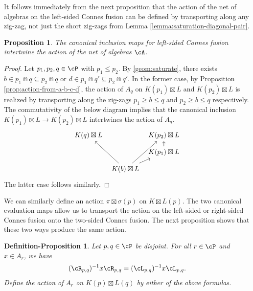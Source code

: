 \documentclass[11pt,reqno]{amsart}
\numberwithin{equation}{section}
\theoremstyle{plain}
\newtheorem{proposition}[equation]{Proposition}
\newtheorem{definitionproposition}[equation]{Definition-Proposition}
\theoremstyle{definition}
\begin{document}
It follows immediately from the next proposition that the action of the net of algebras on the left-sided Connes fusion can be defined by transporting along any zig-zag, not just the short zig-zags from Lemma \ref{lemma:saturation-diagonal-pair}.

\begin{proposition}\label{prop:one-sided-inclusions-intertwine}
    The canonical inclusion maps for left-sided Connes fusion intertwine the action of the net of algebras $\cA$.
\end{proposition}

\begin{proof}
    Let $p_1,p_2,q\in{\cP}$ with $p_1\leq p_2$. By \ref{geom:saturate}, there exists $b\in p_1\Cap q\subseteq p_2\Cap q$ or $d\in p_1\Cap q'\subseteq p_2\Cap q'$. In the former case, by Proposition \ref{prop:action-from-a-b-c-d}, the action of $A_q$ on $K(p_1)\boxtimes L$ and $K(p_2)\boxtimes L$ is realized by transporting along the zig-zags $p_1\geq b\leq q$ and $p_2\geq b\leq q$ respectively. The commutativity of the below diagram implies that the canonical inclusion $K(p_1)\boxtimes L\to K(p_2)\boxtimes L$ intertwines the action of $A_q$.
    \[
    \begin{tikzcd}[column sep=.5em, row sep=.75em]
	{K(q)\boxtimes L} && {K(p_2)\boxtimes L} \\
	&& {K(p_1)\boxtimes L} \\
	& {K(b)\boxtimes L}
	\arrow[from=2-3, to=1-3]
	\arrow[from=3-2, to=1-1]
	\arrow[from=3-2, to=1-3]
	\arrow[from=3-2, to=2-3]
\end{tikzcd}
\]
The latter case follows similarly.
\end{proof}

We can similarly define an action $\pi\boxtimes\sigma(p)$ on $K\boxtimes L(p)$. The two canonical evaluation maps allow us to transport the action on the left-sided or right-sided Connes fusion onto the two-sided Connes fusion. The next proposition shows that these two ways produce the same action.

\begin{definitionproposition}
    Let $p,q\in{\cP}$ be disjoint. For all $r\in{\cP}$ and $x\in A_r$, we have
    \[
    (\cR_{p,q})^{-1}x\cR_{p,q}=(\cL_{p,q})^{-1}x\cL_{p,q}.
    \]
    Define the action of $A_r$ on $K(p)\boxtimes L(q)$ by either of the above formulas.
\end{definitionproposition}
\end{document}
